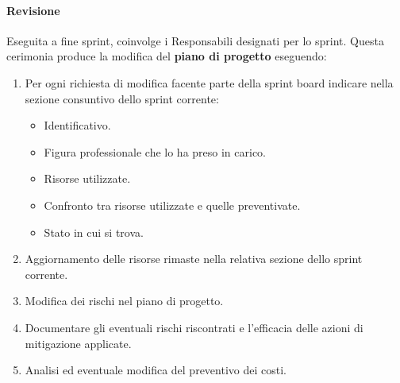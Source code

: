 \paragraph{Revisione}
Eseguita a fine sprint, coinvolge i Responsabili designati per lo sprint.
Questa cerimonia produce la modifica del \textbf{piano di progetto} eseguendo:
\begin{enumerate}
    \item Per ogni richiesta di modifica facente parte della sprint board indicare nella sezione consuntivo dello sprint corrente:
    \begin{itemize}
        \item Identificativo.
        \item Figura professionale che lo ha preso in carico.
        \item Risorse utilizzate.
        \item Confronto tra risorse utilizzate e quelle preventivate.
        \item Stato in cui si trova.
    \end{itemize}
    \item Aggiornamento delle risorse rimaste nella relativa sezione dello sprint corrente.
    \item Modifica dei rischi nel piano di progetto.
    \item Documentare gli eventuali rischi riscontrati e l'efficacia delle azioni di mitigazione applicate.
    \item Analisi ed eventuale modifica del preventivo dei costi.
\end{enumerate}

